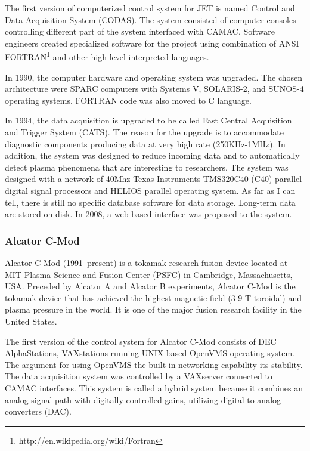 The first version of computerized control system for JET is named Control and Data Acquisition System (CODAS)\cite{van1987codas}. The system consisted of computer consoles controlling different part of the system interfaced with CAMAC. Software engineers created specialized software for the project using combination of ANSI FORTRAN\footnote{http://en.wikipedia.org/wiki/Fortran} and other high-level interpreted languages.

In 1990, the computer hardware and operating system was upgraded. The chosen architecture were SPARC computers with Systems V, SOLARIS-2, and SUNOS-4 operating systems. FORTRAN code was also moved to C language\cite{Krom1999265}.

In 1994, the data acquisition is upgraded to be called Fast Central Acquisition and Trigger System (CATS)\cite{blackler1994jet}. The reason for the upgrade is to accommodate diagnostic components producing data at very high rate (250KHz-1MHz). In addition, the system was designed to reduce incoming data and to automatically detect plasma phenomena that are interesting to researchers. The system was designed with a network of 40Mhz Texas Instruments TMS320C40 (C40) parallel digital signal processors and HELIOS parallel operating system. As far as I can tell, there is still no specific database software for data storage. Long-term data are stored on disk. In 2008, a web-based interface was proposed to the system\cite{hogben2008interfacing}.

\subsubsection{Alcator C-Mod}

Alcator C-Mod (1991--present) is a tokamak research fusion device located at MIT Plasma Science and Fusion Center (PSFC) in Cambridge, Massachusetts, USA. Preceded by Alcator A and Alcator B experiments, Alcator C-Mod is the tokamak device that has achieved the highest magnetic field (3-9 T toroidal) and plasma pressure in the world. It is one of the major fusion research facility in the United States.

The first version of the control system for Alcator C-Mod consists of DEC AlphaStations, VAXstations running UNIX-based OpenVMS operating system. The argument for using OpenVMS the built-in networking capability its stability. The data acquisition system was controlled by a VAXserver connected to CAMAC interfaces\cite{fredian1997data}. This system is called a hybrid system because it combines an analog signal path with digitally controlled gains, utilizing digital-to-analog converters (DAC)\cite{horne1993performance}.

